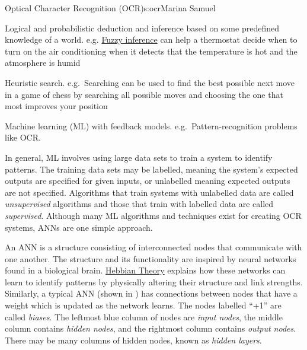 \begin{aosachapter}{Optical Character Recognition (OCR)}{s:ocr}{Marina Samuel}
\begin{aosaitemize}

\item
  Logical and probabilistic deduction and inference based on some
  predefined knowledge of a world. e.g.
  \href{http://www.cs.princeton.edu/courses/archive/fall07/cos436/HIDDEN/Knapp/fuzzy004.htm}{Fuzzy
  inference} can help a thermostat decide when to turn on the air
  conditioning when it detects that the temperature is hot and the
  atmosphere is humid
\item
  Heuristic search. e.g.~Searching can be used to find the best possible
  next move in a game of chess by searching all possible moves and
  choosing the one that most improves your position
\item
  Machine learning (ML) with feedback models. e.g.~Pattern-recognition
  problems like OCR.
\end{aosaitemize}

In general, ML involves using large data sets to train a system to
identify patterns. The training data sets may be labelled, meaning the
system's expected outputs are specified for given inputs, or unlabelled
meaning expected outputs are not specified. Algorithms that train
systems with unlabelled data are called \emph{unsupervised} algorithms
and those that train with labelled data are called \emph{supervised}.
Although many ML algorithms and techniques exist for creating OCR
systems, ANNs are one simple approach.

\label{artificial-neural-networks}

\label{what-are-anns}

\label{sec.ocr.ann} An ANN is a structure consisting of interconnected
nodes that communicate with one another. The structure and its
functionality are inspired by neural networks found in a biological
brain.
\href{http://www.nbb.cornell.edu/neurobio/linster/BioNB420/hebb.pdf}{Hebbian
Theory} explains how these networks can learn to identify patterns by
physically altering their structure and link strengths. Similarly, a
typical ANN (shown in ) has connections between
nodes that have a weight which is updated as the network learns. The
nodes labelled ``+1'' are called \emph{biases}. The leftmost blue column
of nodes are \emph{input nodes}, the middle column contains \emph{hidden
nodes}, and the rightmost column contains \emph{output nodes}. There may
be many columns of hidden nodes, known as \emph{hidden layers}.


\end{aosachapter}
